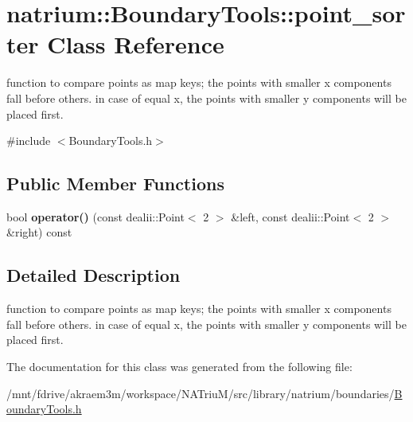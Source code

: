 \hypertarget{classnatrium_1_1BoundaryTools_1_1point__sorter}{
\section{natrium::BoundaryTools::point\_\-sorter Class Reference}
\label{classnatrium_1_1BoundaryTools_1_1point__sorter}
}


function to compare points as map keys; the points with smaller x components fall before others. in case of equal x, the points with smaller y components will be placed first.  


{\ttfamily \#include $<$BoundaryTools.h$>$}\subsection*{Public Member Functions}
\begin{DoxyCompactItemize}
\item 
\hypertarget{classnatrium_1_1BoundaryTools_1_1point__sorter_a38c2278eecae87f9a7350a78234b0433}{
bool {\bfseries operator()} (const dealii::Point$<$ 2 $>$ \&left, const dealii::Point$<$ 2 $>$ \&right) const }
\label{classnatrium_1_1BoundaryTools_1_1point__sorter_a38c2278eecae87f9a7350a78234b0433}

\end{DoxyCompactItemize}


\subsection{Detailed Description}
function to compare points as map keys; the points with smaller x components fall before others. in case of equal x, the points with smaller y components will be placed first. 

The documentation for this class was generated from the following file:\begin{DoxyCompactItemize}
\item 
/mnt/fdrive/akraem3m/workspace/NATriuM/src/library/natrium/boundaries/\hyperlink{BoundaryTools_8h}{BoundaryTools.h}\end{DoxyCompactItemize}

